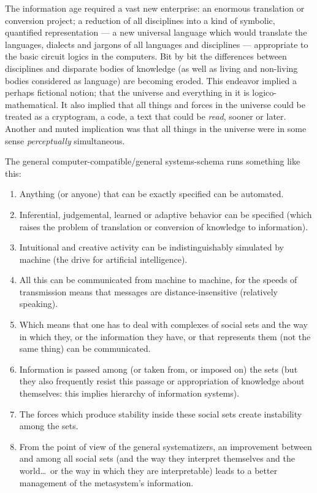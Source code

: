 \documentclass[11pt,twoside,draft]{memoir}
\begin{document}
The information age required a vast new
enterprise: an enormous translation or conversion project; a reduction of all disciplines
into a kind of symbolic, quantified representation --- a new universal language which
would translate the languages, dialects and jargons of all languages and disciplines ---
appropriate to the basic circuit logics in the computers. Bit by bit the differences between
disciplines and disparate bodies of knowledge (as well as living and non-living bodies
considered as language) are becoming eroded. This endeavor implied a perhaps fictional
notion; that the universe and everything in it is logico-mathematical. It also implied
that all things and forces in the universe could be treated as a cryptogram, a code, a
text that could be \emph{read}, sooner or later. Another and muted implication was that all
things in the universe were in some sense \emph{perceptually} simultaneous.

The general computer-compatible\slash general systems-schema runs something like this:
\begin{enumerate}
	\item Anything (or anyone) that can be exactly specified can be automated.
	\item Inferential, judgemental, learned or adaptive behavior can be specified (which raises the problem of translation or conversion of knowledge to information).
	\item Intuitional and creative activity can be indistinguishably simulated by machine (the drive for artificial intelligence).
	\item All this can be communicated from machine to machine, for the speeds of transmission means that messages are distance-insensitive (relatively speaking).
	\item Which means that one has to deal with complexes of social sets and the way in which they, or the information they have, or that represents them (not the same thing) can be communicated.
	\item Information is passed among (or taken from, or imposed on) the sets (but they also frequently resist this passage or appropriation of knowledge about themselves: this implies hierarchy of information systems).
	\item The forces which produce stability inside these social sets create instability among the sets.
	\item From the point of view of the general systematizers, an improvement between and among all social sets (and the way they interpret themselves and the world\ldots\ or the way in which they are interpretable) leads to a better management of the metasystem's information.
\end{enumerate}
\end{document}
